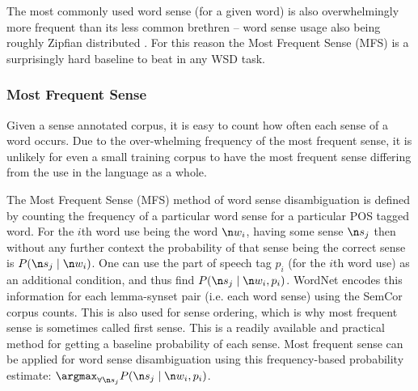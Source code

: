 {The most commonly used word sense (for a given word) is also overwhelmingly more frequent than its less common brethren -- word sense usage also being roughly Zipfian distributed .
For this reason the Most Frequent Sense (MFS) is a surprisingly hard baseline to beat in any WSD task.
\subsubsection{Most Frequent Sense}\label{sec:most-frequent-sense}
Given a sense annotated corpus, it is easy to count how often each sense of a word occurs.
Due to the over-whelming frequency of the most frequent sense, it is unlikely for even a small training corpus to have the most frequent sense differing from the use in the language as a whole.

The Most Frequent Sense (MFS) method of word sense disambiguation is defined by counting the frequency of a particular word sense for a particular POS tagged word.
For the $i$th word use being the word $\n w_i$, having some sense $\n s_j$
then without any further context the 
probability of that sense being the correct sense is $P(\n s_j \mid \n w_i)$.
One can use the part of speech tag $p_i$ (for the $i$th word use) as an additional condition, and thus find $P(\n s_j \mid \n w_i, p_i)$.
WordNet encodes this information for each lemma-synset pair (i.e. each word sense) using the SemCor corpus counts.
This is also used for sense ordering, which is why most frequent sense  is sometimes called first sense.
This is a readily available and practical method for getting a baseline probability of each sense.
Most frequent sense can be applied for word sense disambiguation using this frequency-based probability estimate:  $\argmax_{\forall \n s_j} P(\n s_j \mid \n w_i, p_i)$.


}
